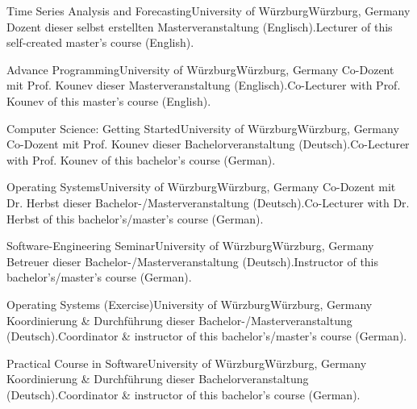 \begin{cventries}

    {Time Series Analysis and Forecasting}{University of Würzburg}{Würzburg, Germany}%
    {} %
    {Dozent dieser selbst erstellten Masterveranstaltung (Englisch).}{Lecturer of this self-created master's course (English).}

    {Advance Programming}{University of Würzburg}{Würzburg, Germany}%
    {} %
    {Co-Dozent mit Prof. Kounev dieser Masterveranstaltung (Englisch).}{Co-Lecturer with Prof. Kounev of this master's course (English).}

    {Computer Science: Getting Started}{University of Würzburg}{Würzburg, Germany}%
    {} %
    {Co-Dozent mit Prof. Kounev dieser Bachelorveranstaltung (Deutsch).}{Co-Lecturer with Prof. Kounev of this bachelor's course (German).}

    {Operating Systems}{University of Würzburg}{Würzburg, Germany}%
    {} %
    {Co-Dozent mit Dr. Herbst dieser Bachelor-/Masterveranstaltung (Deutsch).}{Co-Lecturer with Dr. Herbst of this bachelor's/master's course (German).}

    {Software-Engineering Seminar}{University of Würzburg}{Würzburg, Germany}%
    {} %
    {Betreuer dieser Bachelor-/Masterveranstaltung (Deutsch).}{Instructor of this bachelor's/master's course (German).}

    {Operating Systems (Exercise)}{University of Würzburg}{Würzburg, Germany}%
    {} %
    {Koordinierung \& Durchführung dieser Bachelor-/Masterveranstaltung (Deutsch).}{Coordinator \& instructor of this bachelor's/master's course (German).}

    {Practical Course in Software}{University of Würzburg}{Würzburg, Germany}%
    {} %
    {Koordinierung \& Durchführung dieser Bachelorveranstaltung (Deutsch).}{Coordinator \& instructor of this bachelor's course (German).}

\end{cventries}